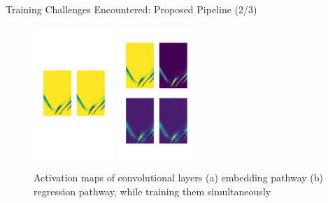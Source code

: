 \documentclass[aspectratio=169]{beamer}
\begin{document}
\begin{frame}{Training Challenges Encountered: Proposed Pipeline (2/3)}

\begin{figure}[h]
      
        \centering
        \includegraphics[width=0.4\linewidth, height=5cm]{images/activation_embededing_nofix.png} 
        \includegraphics[width=0.4\linewidth,height=5cm]{images/embedding_regression_nofix.png}
        \caption{Activation maps of convolutional layers (a) embedding pathway (b) regression pathway, while training them simultaneously}
        \end{figure}
\end{frame}
\end{document}
